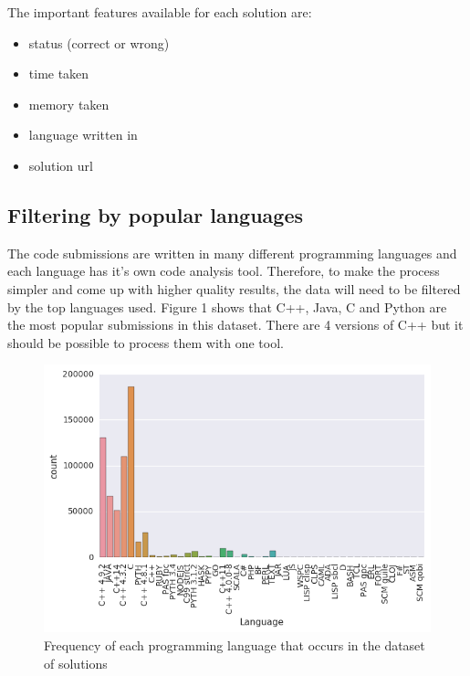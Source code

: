 \documentclass{article}
\begin{document}
The important features available for each solution are:

\begin{itemize}
\item
  status (correct or wrong)
\item
  time taken
\item
  memory taken
\item
  language written in
\item
  solution url
\end{itemize}

\subsection{Filtering by popular
languages}\label{filtering-by-popular-languages}

The code submissions are written in many different programming languages
and each language has it's own code analysis tool. Therefore, to make
the process simpler and come up with higher quality results, the data
will need to be filtered by the top languages used. Figure 1 shows that
C++, Java, C and Python are the most popular submissions in this
dataset. There are 4 versions of C++ but it should be possible to
process them with one tool.

\begin{figure}[ht]
\vskip 0.2in
\begin{center}
\centerline{\includegraphics[width=\columnwidth]{images/languages.png}}
\caption{Frequency of each programming language that occurs in the dataset of solutions }
\label{languages}
\end{center}
\vskip -0.2in
\end{figure}
\end{document}
